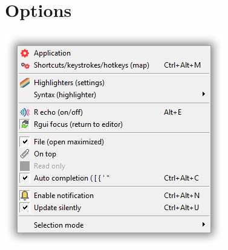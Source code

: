 
\hypertarget{menu_options}{}
\section{Options}

\includegraphics[scale=0.50]{./res/menu_options.png}\\

